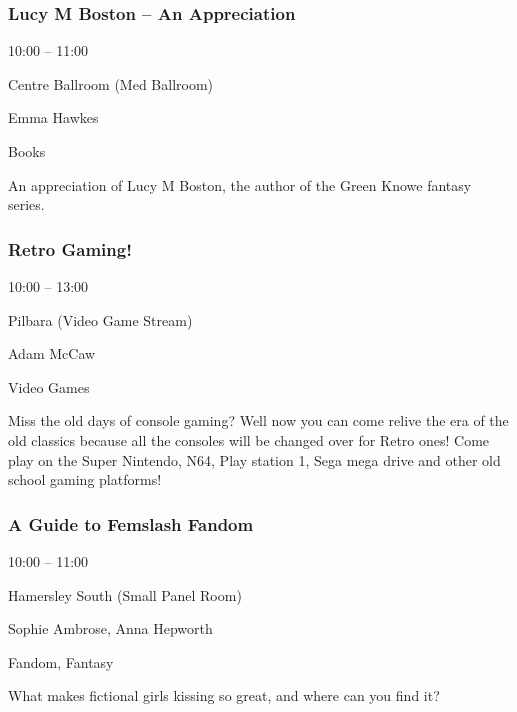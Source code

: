\documentclass{scrreprt}
\begin{document}
\begin{multicols}{2}
\subsubsection*{Lucy M Boston – An Appreciation}\begin{description}
\setlength{\itemsep}{0pt}
\setlength{\parsep}{0pt}
\setlength{\parskip}{0pt}
\item[Time:]{10:00 -- 11:00}
\item[Venue:]{Centre Ballroom (Med Ballroom)}
\item[People:]{Emma Hawkes}
\item[Tags:]{Books}\end{description}
An appreciation of Lucy M Boston, the author of the Green Knowe fantasy series.
\subsubsection*{Retro Gaming!}\begin{description}
\setlength{\itemsep}{0pt}
\setlength{\parsep}{0pt}
\setlength{\parskip}{0pt}
\item[Time:]{10:00 -- 13:00}
\item[Venue:]{Pilbara (Video Game Stream)}
\item[People:]{Adam McCaw}
\item[Tags:]{Video Games}\end{description}
Miss the old days of console gaming? Well now you can come relive the era of the old classics because all the consoles will be changed over for Retro ones! Come play on the Super Nintendo, N64, Play station 1, Sega mega drive and other old school gaming platforms!
\subsubsection*{A Guide to Femslash Fandom}\begin{description}
\setlength{\itemsep}{0pt}
\setlength{\parsep}{0pt}
\setlength{\parskip}{0pt}
\item[Time:]{10:00 -- 11:00}
\item[Venue:]{Hamersley South (Small Panel Room)}
\item[People:]{Sophie Ambrose, Anna Hepworth}
\item[Tags:]{Fandom, Fantasy}\end{description}
What makes fictional girls kissing so great, and where can you find it?

\end{multicols}
\end{document}
